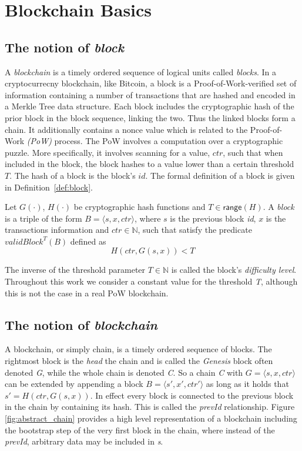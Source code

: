\section{Blockchain Basics}
\subsection{The notion of \emph{block}}
A \emph{blockchain} is a timely ordered sequence of logical units called \emph{blocks}.  In a cryptocurrecny
blockchain, like Bitcoin, a block is a Proof-of-Work-verified  set of information containing a number of
transactions that are hashed and encoded in a Merkle Tree data structure. Each block includes the cryptographic hash of the prior block in the block sequence, linking the two. Thus the linked blocks form a chain. It additionally contains a nonce value which is related to the Proof-of-Work \emph{(PoW)} process. The PoW involves a
computation over a cryptographic puzzle. More specifically, it involves scanning for a value, $ctr$, such that when included in the block, the block hashes to a value lower than a
certain threshold $T$. The hash of a block is the block's $id$. The formal definition of a block is given in Definition~\ref{def:block}.

\begin{definition}[Block]\label{def:block}
	Let $G(\cdot)$, $H(\cdot)$ be cryptographic hash functions and $T\in \textsf{range}(H)$. A \textit{block} is a
	triple of the form $B = \langle s, x, ctr \rangle$, where $s$ is the previous block \textit{id}, $x$
	is the transactions information and $ctr \in \mathbb{N}$, such that satisfy the predicate
	$validBlock^T(B)$ defined as
	\begin{equation}
		H(ctr, G(s,x)) < T
	\end{equation}
\end{definition}

The inverse of the threshold parameter $T \in \mathbb{N}$ is called the block's \textit{difficulty level}.
Throughout this work we consider a constant value for the threshold \textit{T}, although this is not
the case in a real PoW blockchain. 

\subsection{The notion of \emph{blockchain}}


A blockchain, or simply chain, is a timely ordered sequence of blocks.
The rightmost block is the \textit{head} the chain and is called the \textit{Genesis} block often
denoted \textit{G}, while the whole chain is denoted \textit{C}. So a chain \textit{C} with
$G = \langle s, x, ctr \rangle$ can be extended by appending a block $B = \langle s', x', ctr'
\rangle$ as long as it holds that $s' = H(ctr, G(s,x))$. In effect every block is connected to the
previous block in the chain by containing its hash. This is called the \textit{prevId} relationship.
Figure \ref{fig:abstract_chain} provides a high level representation of a blockchain including the
bootstrap step of the very first block in the chain, where instead of the \textit{prevId},
arbitrary data may be included in \textit{s}.

